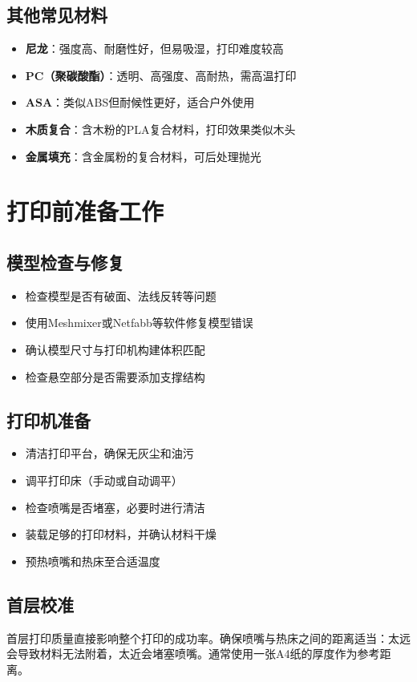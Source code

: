 \documentclass[12pt,UTF8]{ctexbook}
\begin{document}
\subsection{其他常见材料}
\begin{itemize}
\item \textbf{尼龙}：强度高、耐磨性好，但易吸湿，打印难度较高
\item \textbf{PC（聚碳酸酯）}：透明、高强度、高耐热，需高温打印
\item \textbf{ASA}：类似ABS但耐候性更好，适合户外使用
\item \textbf{木质复合}：含木粉的PLA复合材料，打印效果类似木头
\item \textbf{金属填充}：含金属粉的复合材料，可后处理抛光
\end{itemize}

\section{打印前准备工作}

\subsection{模型检查与修复}
\begin{itemize}
\item 检查模型是否有破面、法线反转等问题
\item 使用Meshmixer或Netfabb等软件修复模型错误
\item 确认模型尺寸与打印机构建体积匹配
\item 检查悬空部分是否需要添加支撑结构
\end{itemize}

\subsection{打印机准备}
\begin{itemize}
\item 清洁打印平台，确保无灰尘和油污
\item 调平打印床（手动或自动调平）
\item 检查喷嘴是否堵塞，必要时进行清洁
\item 装载足够的打印材料，并确认材料干燥
\item 预热喷嘴和热床至合适温度
\end{itemize}

\subsection{首层校准}
首层打印质量直接影响整个打印的成功率。确保喷嘴与热床之间的距离适当：太远会导致材料无法附着，太近会堵塞喷嘴。通常使用一张A4纸的厚度作为参考距离。
\end{document}
